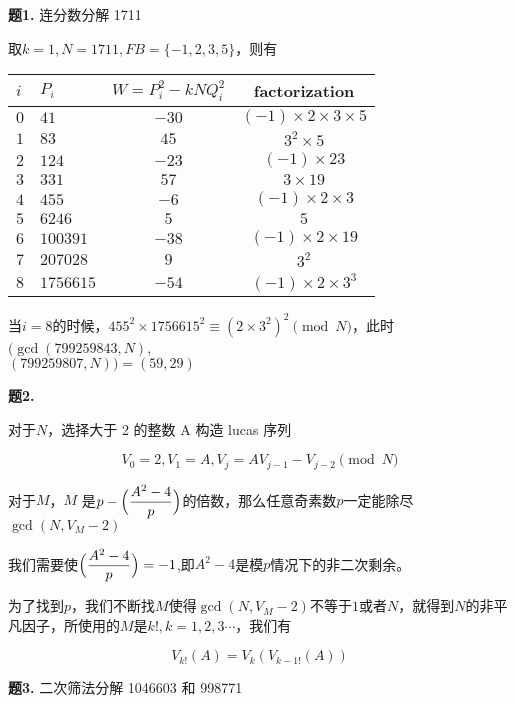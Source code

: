 \documentclass{article}
\begin{document}
\noindent \textbf{题1. }连分数分解 1711

取$k=1, N=1711, FB=\{-1,2,3,5\}$，则有

\begin{table}[h]
    \centering
    \begin{tabular}{llcc}
        \hline
        $i$ & $P_i$ & $W=P_i^2-kNQ_i^2$ & factorization\\
        \hline
        $0$ & $41$ & $-30$ & $(-1)\times 2 \times3\times 5$\\
        $1$ & $83$ & $45$ & $3^2\times 5$ \\
        $2$ & $124$ & $-23$ &$(-1)\times 23$\\
        $3$ & $331$ & $57$ & $3\times 19$\\
        $4$ & $455$ & $-6$ & $(-1)\times 2 \times 3$\\
        $5$ & $6246$ & $5$ & $5$\\
        $6$ & $100391$ & $-38$ & $(-1)\times 2 \times 19$\\
        $7$ & $207028$ & $9$ & $3^2$\\
        $8$ & $1756615$ & $-54$ & $(-1)\times 2\times 3^3$\\
      \end{tabular}
\end{table}

当$i=8$的时候，$455^2\times 1756615^2\equiv (2\times 3^2)^2\pmod{N}$，此时$(\gcd(799259843,N)$,\\$(799259807,N))=(59,29)$

\noindent \textbf{题2.} 

对于$N$，选择大于 2 的整数 A 构造 lucas 序列

\begin{equation}
  V_0 = 2, V_1 = A, V_j = AV_{j-1}-V_{j-2} \pmod{N}
\end{equation}

对于$M$，$M$ 是$p-\Bigl(\dfrac{A^2-4}{p}\Bigr)$的倍数，那么任意奇素数$p$一定能除尽$\gcd(N,V_{M}-2)$

我们需要使$\Bigl(\dfrac{A^2-4}{p}\Bigr)=-1$,即$A^2-4$是模$p$情况下的非二次剩余。

为了找到$p$，我们不断找$M$使得$\gcd(N,V_{M}-2)$不等于$1$或者$N$，就得到$N$的非平凡因子，所使用的$M$是$k!, k = 1, 2, 3\cdots$，我们有

\begin{equation}
  V_{k!}(A) = V_{k}\left(V_{k-1!}(A)\right)
\end{equation}


\noindent \textbf{题3.} 二次筛法分解 1046603 和 998771
\end{document}
